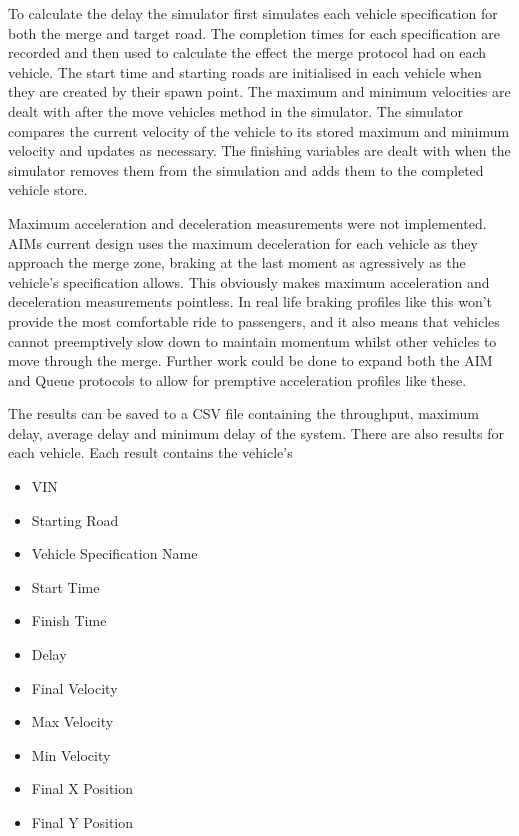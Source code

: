 To calculate the delay the simulator first simulates each vehicle specification for both the merge and target road. The completion times for each specification are recorded and then used to calculate the effect the merge protocol had on each vehicle. The start time and starting roads are initialised in each vehicle when they are created by their spawn point. The maximum and minimum velocities are dealt with after the move vehicles method in the simulator. The simulator compares the current velocity of the vehicle to its stored maximum and minimum velocity and updates as necessary. The finishing variables are dealt with when the simulator removes them from the simulation and adds them to the completed vehicle store. 

Maximum acceleration and deceleration measurements were not implemented. AIMs current design uses the maximum deceleration for each vehicle as they approach the merge zone, braking at the last moment as agressively as the vehicle's specification allows. This obviously makes maximum acceleration and deceleration measurements pointless. In real life braking profiles like this won't provide the most comfortable ride to passengers, and it also means that vehicles cannot preemptively slow down to maintain momentum whilst other vehicles to move through the merge. Further work could be done to expand both the AIM and Queue protocols to allow for premptive acceleration profiles like these.

The results can be saved to a CSV file containing the throughput, maximum delay, average delay  and minimum delay of the system. There are also results for each vehicle. Each result contains the vehicle's
\begin{itemize}
\item VIN
\item Starting Road
\item Vehicle Specification Name
\item Start Time
\item Finish Time
\item Delay
\item Final Velocity
\item Max Velocity
\item Min Velocity
\item Final X Position
\item Final Y Position
\end{itemize}

